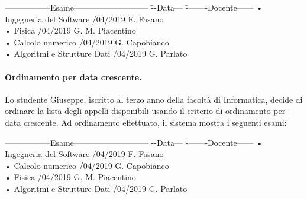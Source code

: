 \begin{tabbing}
	\hspace{1cm}-----------------Esame--------------------------- \= --Data--- \= --------Docente------ \kill
	\hspace{1cm} • Ingegneria del Software /04/2019   \> \hspace{1cm} F. Fasano \\
	\hspace{1cm} • Fisica /04/2019 \> \hspace{1cm} G. M. Piacentino  \\
	\hspace{1cm} • Calcolo numerico /04/2019  \> \hspace{1cm} G. Capobianco \\
	\hspace{1cm} • Algoritmi e Strutture Dati /04/2019 \> \hspace{1cm} G. Parlato \\
	
	
	
\end{tabbing}

\paragraph{Ordinamento per data crescente.}
 Lo studente Giuseppe, iscritto al terzo anno della facoltà di Informatica, decide di ordinare la lista degli appelli disponibili usando il criterio di ordinamento per data crescente. Ad ordinamento effettuato, il sistema mostra i seguenti esami:
 
\begin{tabbing}
	\hspace{1cm}-----------------Esame--------------------------- \= --Data--- \= --------Docente------ \kill
	\hspace{1cm} • Ingegneria del Software /04/2019   \> \hspace{1cm} F. Fasano \\
	\hspace{1cm} • Calcolo numerico /04/2019  \> \hspace{1cm} G. Capobianco \\
	\hspace{1cm} • Fisica /04/2019 \> \hspace{1cm} G. M. Piacentino  \\
	\hspace{1cm} • Algoritmi e Strutture Dati /04/2019 \> \hspace{1cm} G. Parlato \\
\end{tabbing} 

